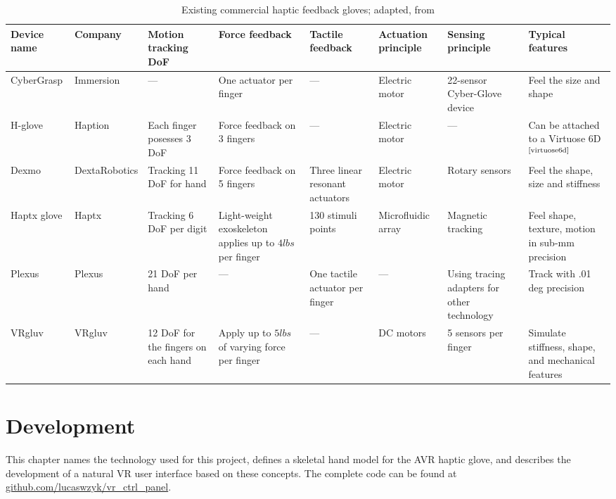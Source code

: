 \documentclass[hyperref, bachelorofscience]{cgvpub}
\newcommand{\newcite}[1]{$ ^{\text{\cite{#1}}} $}
\begin{document}
\begin{table}
	\footnotesize
	\centering
	\begin{tabularx}{\textwidth}{llXXXXXX}		
		\toprule[2pt] \midrule
		\textbf{Device name} & \textbf{Company} & \textbf{Motion tracking DoF} & \textbf{Force feedback} & \textbf{Tactile feedback} & \textbf{Actuation principle} & \textbf{Sensing principle} & \textbf{Typical features}\\
		\midrule
		CyberGrasp & Immersion & --- & One actuator per finger & --- & Electric motor & 22-sensor Cyber-Glove device & Feel the size and shape \\
		\midrule
		H-glove & Haption & Each finger posesses 3 DoF & Force feedback on 3 fingers & --- & Electric motor & --- & Can be attached to a Virtuose 6D\newcite{virtuose6d}\\
		\midrule
		Dexmo & DextaRobotics & Tracking 11 DoF for hand & Force feedback on 5 fingers & Three linear resonant actuators & Electric motor & Rotary sensors & Feel the shape, size and stiffness \\
		\midrule
		Haptx glove & Haptx & Tracking 6 DoF per digit & Light-weight exoskeleton applies up to $ 4lbs $ per finger & 130 stimuli points & Microfluidic array & Magnetic tracking & Feel shape, texture, motion in sub-mm precision\\
		\midrule
		Plexus & Plexus & 21 DoF per hand & --- & One tactile actuator per finger & --- & Using tracing adapters for other technology & Track with .01 deg precision\\
		\midrule
		VRgluv & VRgluv & 12 DoF for the fingers on each hand & Apply up to $ 5lbs $ of varying force per finger & --- & DC motors & 5 sensors per finger & Simulate stiffness, shape, and mechanical features\\
		\midrule \bottomrule[2pt]
	\end{tabularx}
	\caption{Existing commercial haptic feedback gloves; adapted, from \cite{wang19}}
	\label{tab:commercial_gloves}
\end{table}

\chapter{Development} \label{ch:devel}
This chapter names the technology used for this project, defines a skeletal hand model for the \Gls{AVR} haptic glove, and describes the development of a natural VR user interface based on these concepts. The complete code can be found at \url{github.com/lucaswzyk/vr_ctrl_panel}.
\end{document}
